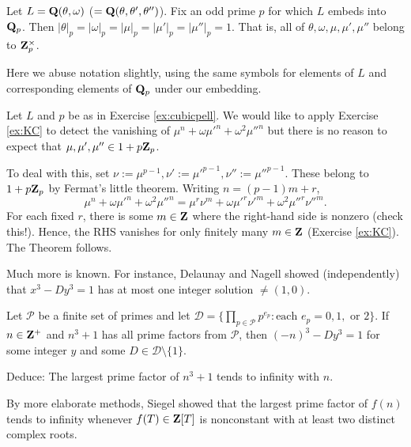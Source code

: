 \begin{prob}\label{ex:cubicpell}\label{prob:all1} Let $L = \mathbf{Q}(\theta, \omega)$ ($= \mathbf{Q}(\theta, \theta', \theta'')$). Fix an odd prime $p$ for which $L$ embeds into $\mathbf{Q}_p$. Then $|\theta|_p = |\omega|_p= |\mu|_p = |\mu'|_p =|\mu''|_p = 1$. That is, all of $\theta,\omega, \mu, \mu', \mu''$ belong to $\mathbf{Z}_p^{\times}$.

{\scriptsize Here we abuse notation slightly, using the same symbols for elements of $L$ and corresponding elements of $\mathbf{Q}_p$ under our embedding.}
\end{prob}

\begin{prob}\label{ex:cubicpell2}\label{prob:notconstantzero} Let $L$ and $p$ be as in Exercise \ref{ex:cubicpell}. We would like to apply Exercise \ref{ex:KC} to detect the vanishing of $\mu^n + \omega \mu'^n + \omega^2 \mu''^n$ but there is no reason to expect that $\mu, \mu', \mu'' \in 1 + p\mathbf{Z}_p$. 

To deal with this, set $\nu:= \mu^{p-1}, \nu':= \mu'^{p-1}, \nu'':= \mu''^{p-1}$. These belong to $1+p\mathbf{Z}_p$ by Fermat's little theorem. Writing $n=(p-1)m+r$, 
\[ \mu^n + \omega \mu'^n + \omega^2 \mu''^n= \mu^{r} \nu^m+ \omega \mu'^{r} \nu'^{m} + \omega^2 \mu''^{r} \nu''^{m}. \]
For each fixed $r$, there is some $m \in \mathbf{Z}$ where the right-hand side is nonzero (check this!). Hence, the RHS vanishes for only finitely many $m \in \mathbf{Z}$ (Exercise \ref{ex:KC}). The Theorem follows.\

{\scriptsize Much more is known. For instance, Delaunay and Nagell showed (independently) that $x^3-Dy^3=1$ has at most one integer solution $\ne (1,0)$.}
\end{prob}

\begin{prob}\label{prob:strikingcor} Let $\mathcal{P}$ be a finite set of primes and let $\mathcal{D}=\{\prod_{p \in \mathcal{P}} p^{e_p}: \text{each $e_p =0,1,\text{ or }2$}\}$. If $n \in \mathbf{Z}^{+}$ and $n^3+1$ has all prime factors from $\mathcal{P}$, then $(-n)^3-Dy^3=1$ for some integer $y$ and some $D\in \mathcal{D}\setminus\{1\}$.

Deduce: The largest prime factor of $n^3+1$ tends to infinity with $n$.

{\scriptsize By more elaborate methods, Siegel showed that the largest prime factor of $f(n)$ tends to infinity whenever $f(T)\in \mathbf{Z}[T]$ is nonconstant with at least two distinct complex roots.}
\end{prob}


